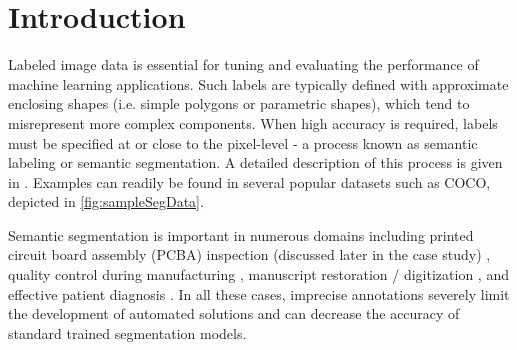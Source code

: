 \section{Introduction}
Labeled image data is essential for tuning and evaluating the performance of machine learning applications.
Such labels are typically defined with approximate enclosing shapes (i.e. simple polygons or parametric shapes), which tend to misrepresent more complex components.
When high accuracy is required, labels must be specified at or close to the pixel-level - a process known as semantic labeling or semantic segmentation.
A detailed description of this process is given in \cite{chengSurveyAnalysisAutomatic2018}. Examples can readily be found in several popular datasets such as COCO, depicted in \autoref{fig:sampleSegData}.

\makeSampleSegFig


Semantic segmentation is important in numerous domains including printed circuit board assembly (PCBA) inspection (discussed later in the case study) \cite{paradis2020color,azhaganReviewAutomaticBill2019}, quality control during manufacturing \cite{fergusonDetectionSegmentationManufacturing2018,anagnostopoulosComputerVisionApproach2001,anagnostopoulosHighPerformanceComputing2002}, manuscript restoration / digitization \cite{gatosSegmentationfreeRecognitionTechnique2004,kesimanNewSchemeText2016,jainTextSegmentationUsing1992,taxtSegmentationDocumentImages1989,fujisawaSegmentationMethodsCharacter1992}, and effective patient diagnosis \cite{seifertSemanticAnnotationMedical2010,rajchlDeepCutObjectSegmentation2017,yushkevichUserguided3DActive2006,iakovidisRatsnakeVersatileImage2014}.
In all these cases, imprecise annotations severely limit the development of automated solutions and can decrease the accuracy of standard trained segmentation models.

